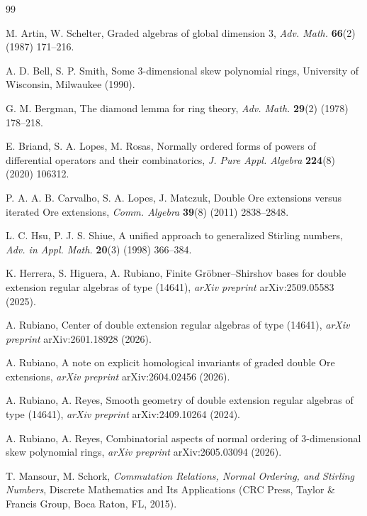 \documentclass{amsart}
\theoremstyle{definition}
\theoremstyle{remark}
\numberwithin{equation}{section}
\begin{document}
\begin{thebibliography}{99}

M. Artin, W. Schelter, Graded algebras of global dimension 3,
{\em Adv. Math.} \textbf{66}(2) (1987) 171--216.

A. D. Bell, S. P. Smith, Some 3-dimensional skew polynomial rings,
University of Wisconsin, Milwaukee (1990).

G. M. Bergman, The diamond lemma for ring theory,
{\em Adv. Math.} \textbf{29}(2) (1978) 178--218.

E. Briand, S. A. Lopes, M. Rosas, Normally ordered forms of powers of differential operators and their combinatorics,
{\em J. Pure Appl. Algebra} \textbf{224}(8) (2020) 106312.

P. A. A. B. Carvalho, S. A. Lopes, J. Matczuk, Double Ore extensions versus iterated Ore extensions,
{\em Comm. Algebra} \textbf{39}(8) (2011) 2838--2848.

L. C. Hsu, P. J. S. Shiue, A unified approach to generalized Stirling numbers,
{\em Adv. in Appl. Math.} \textbf{20}(3) (1998) 366--384.


K. Herrera, S. Higuera, A. Rubiano, Finite Gr\"obner--Shirshov bases for double extension regular algebras of type (14641),
{\em arXiv preprint} arXiv:2509.05583 (2025).

A. Rubiano, Center of double extension regular algebras of type (14641),
{\em arXiv preprint} arXiv:2601.18928 (2026).

A. Rubiano, A note on explicit homological invariants of graded double Ore extensions,
{\em arXiv preprint} arXiv:2604.02456 (2026).

A. Rubiano, A. Reyes, Smooth geometry of double extension regular algebras of type (14641),
{\em arXiv preprint} arXiv:2409.10264 (2024).

A. Rubiano, A. Reyes, Combinatorial aspects of normal ordering of $3$-dimensional skew polynomial rings,
{\em arXiv preprint} arXiv:2605.03094 (2026).

T. Mansour, M. Schork, {\em Commutation Relations, Normal Ordering, and Stirling Numbers},
Discrete Mathematics and Its Applications (CRC Press, Taylor \& Francis Group, Boca Raton, FL, 2015).


\end{thebibliography}
\end{document}
